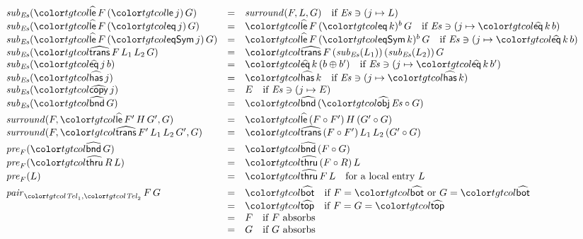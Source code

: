 \begin{figure}
\small
\color{tgtcol}
\[
\begin{array}{@{}lcl@{}}
\mathit{sub}_{\mathit{Es}}(\form{le}\,F\,(\ev{le}\,j)\,G) & = & \mathit{surround}(F, L, G) \quad \text{if } \mathit{Es} \ni (j \mapsto L) \\
\mathit{sub}_{\mathit{Es}}(\form{le}\,F\,(\ev{eq}\,j)\,G) & = & \form{le}\,F\,(\ev{eq}\,k)^{b}\,G \quad \text{if } \mathit{Es} \ni (j \mapsto \form{eq}\,k\,b) \\
\mathit{sub}_{\mathit{Es}}(\form{le}\,F\,(\ev{eqSym}\,j)\,G) & = & \form{le}\,F\,(\ev{eqSym}\,k)^{b}\,G \quad \text{if } \mathit{Es} \ni (j \mapsto \form{eq}\,k\,b) \\
\mathit{sub}_{\mathit{Es}}(\form{trans}\,F\,L_1\,L_2\,G) & = & \form{trans}\,F\,(\mathit{sub}_{\mathit{Es}}(L_1))\,(\mathit{sub}_{\mathit{Es}}(L_2))\,G \\
\mathit{sub}_{\mathit{Es}}(\form{eq}\,j\,b) & = & \form{eq}\,k\,(b \oplus b') \quad \text{if } \mathit{Es} \ni (j \mapsto \form{eq}\,k\,b') \\
\mathit{sub}_{\mathit{Es}}(\form{has}\,j) & = & \form{has}\,k \quad \text{if } \mathit{Es} \ni (j \mapsto \form{has}\,k) \\
\mathit{sub}_{\mathit{Es}}(\form{copy}\,j) & = & E \quad \text{if } \mathit{Es} \ni (j \mapsto E) \\
\mathit{sub}_{\mathit{Es}}(\form{bnd}\,G) & = & \form{bnd}\,(\form{obj}\,\mathit{Es} \circ G) \\[3pt]
\mathit{surround}(F, \form{le}\,F'\,H\,G', G) & = & \form{le}\,(F \circ F')\,H\,(G' \circ G) \\
\mathit{surround}(F, \form{trans}\,F'\,L_1\,L_2\,G', G) & = & \form{trans}\,(F \circ F')\,L_1\,L_2\,(G' \circ G) \\[3pt]
\mathit{pre}_F(\form{bnd}\,G) & = & \form{bnd}\,(F \circ G) \\
\mathit{pre}_F(\form{thru}\,R\,L) & = & \form{thru}\,(F \circ R)\,L \\
\mathit{pre}_F(L) & = & \form{thru}\,F\,L \quad \text{for a local entry } L \\[3pt]
\mathit{pair}_{\tel_1,\tel_2}\,F\,G & = & \form{bot} \quad \text{if } F = \form{bot} \text{ or } G = \form{bot} \\
& = & \form{top} \quad \text{if } F = G = \form{top} \\
& = & F \quad \text{if } F \text{ absorbs} \\
& = & G \quad \text{if } G \text{ absorbs} \\

\end{array}\]
\end{figure}
